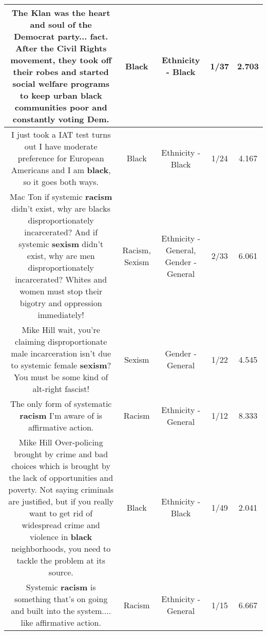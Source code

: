 \documentclass[11pt]{article}
\newlength\mylength
\begin{document}
\begin{center}
\begin{longtable}{|C{.65\mylength}|C{.30\mylength}|C{.12\mylength}|C{.12\mylength}|C{.12\mylength}|}
  \small The Klan was the heart and soul of the Democrat party... fact. After the Civil Rights movement, they took off their robes and started social welfare programs to keep urban \textbf{black} communities poor and constantly voting Dem.\normalsize   & Black & Ethnicity - Black & 1/37 & 2.703 \\  \hline
  \small I just took a IAT test turns out I have moderate preference for European Americans and I am \textbf{black}, so it goes both ways.\normalsize   & Black & Ethnicity - Black & 1/24 & 4.167 \\  \hline
  \small Mac Ton if systemic \textbf{racism} didn't exist, why are blacks disproportionately incarcerated? And if systemic \textbf{sexism} didn't exist, why are men disproportionately incarcerated? Whites and women must stop their bigotry and oppression immediately!\normalsize   & Racism, Sexism & Ethnicity - General, Gender - General & 2/33 & 6.061 \\  \hline
  \small Mike Hill wait, you're claiming disproportionate male incarceration isn't due to systemic female \textbf{sexism}? You must be some kind of alt-right fascist!\normalsize   & Sexism & Gender - General & 1/22 & 4.545 \\  \hline
  \small The only form of systematic \textbf{racism} I'm aware of is affirmative action.\normalsize   & Racism & Ethnicity - General & 1/12 & 8.333 \\  \hline
  \small Mike Hill Over-policing brought by crime and bad choices which is brought by the lack of opportunities and poverty. Not saying criminals are justified, but if you really want to get rid of widespread crime and violence in \textbf{black} neighborhoods, you need to tackle the problem at its source.\normalsize   & Black & Ethnicity - Black & 1/49 & 2.041 \\  \hline
  \small Systemic \textbf{racism} is something that's on going and built into the system.... like affirmative action.\normalsize   & Racism & Ethnicity - General & 1/15 & 6.667 \\  \hline

\end{longtable}
\end{center}
\end{document}
